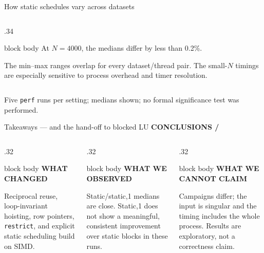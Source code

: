 \documentclass[aspectratio=169,10pt]{beamer}
\newcommand{\eyebrow}[1]{%
  {\color{cyan}\scriptsize\bfseries #1}\par\vspace{.08cm}}
\newcommand{\smallmuted}[1]{{\color{muted}\small #1}}
\newcommand{\cardtitle}[2]{%
  {\color{#1}\bfseries\small #2}\par\vspace{.08cm}}
\begin{document}
\begin{frame}{How static schedules vary across datasets}
\begin{columns}[T,onlytextwidth]
\begin{column}{.34\textwidth}
\begin{beamercolorbox}[rounded=true,sep=.2cm,wd=\textwidth]{block body}
        \small At $N=4000$, the medians differ by less than 0.2\%.
        \vspace{.12cm}

        \smallmuted{The min--max ranges overlap for every dataset/thread
        pair. The small-$N$ timings are especially sensitive to process
        overhead and timer resolution.}
      \end{beamercolorbox}
    \end{column}
  \end{columns}
  \vspace{.12cm}
  \centering\color{muted}\tiny Five \texttt{perf} runs per setting; medians
  shown; no formal significance test was performed.
\end{frame}

\begin{frame}{Takeaways — and the hand-off to blocked LU}
  \eyebrow{CONCLUSIONS \quad / }
  \vspace{.05cm}
  \begin{columns}[T,onlytextwidth]
    \begin{column}{.32\textwidth}
      \begin{beamercolorbox}[rounded=true,sep=.2cm,wd=\textwidth,ht=2.15cm]{block body}
        \cardtitle{cyan}{WHAT CHANGED}
        \small Reciprocal reuse, loop-invariant hoisting, row pointers,
        \texttt{restrict}, and explicit static scheduling build on SIMD.
      \end{beamercolorbox}
    \end{column}
    \begin{column}{.32\textwidth}
      \begin{beamercolorbox}[rounded=true,sep=.2cm,wd=\textwidth,ht=2.15cm]{block body}
        \cardtitle{mint}{WHAT WE OBSERVED}
        \small Static/static,1 medians are close. Static,1 does not show a meaningful,
        consistent improvement over static blocks in these runs.
      \end{beamercolorbox}
    \end{column}
    \begin{column}{.32\textwidth}
      \begin{beamercolorbox}[rounded=true,sep=.2cm,wd=\textwidth,ht=2.15cm]{block body}
        \cardtitle{coral}{WHAT WE CANNOT CLAIM}
        \small Campaigns differ; the input is singular and the timing includes
        the whole process. Results are exploratory, not a correctness claim.
      \end{beamercolorbox}
    \end{column}
  \end{columns}


\end{frame}
\end{document}
